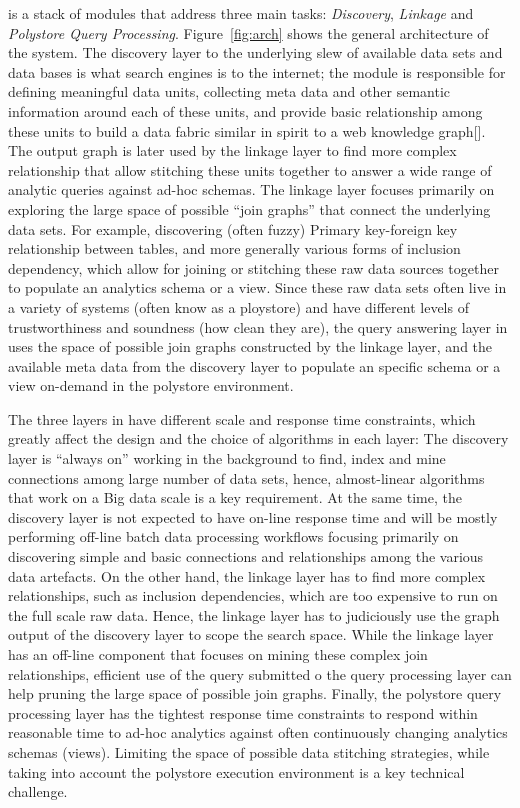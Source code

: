 \dcv is a stack of modules that address three main tasks: {\em Discovery}, 
{\em Linkage} and  {\em Polystore Query Processing}. Figure~\ref{fig:arch} shows the general architecture of the \dcv system. The discovery layer to the underlying slew of available data sets and data bases is what search engines is to the internet; the module is responsible for defining meaningful data units, collecting meta data and other semantic information around each of these units, and provide basic relationship among these units to build a data fabric similar in spirit to a web knowledge graph[]. The output graph is later used by the linkage layer to find more complex relationship that allow stitching these units together to answer a wide range of analytic queries against ad-hoc schemas. The linkage layer focuses primarily on exploring the large space of possible ``join graphs'' that connect the underlying data sets. For example, discovering (often fuzzy) Primary key-foreign key relationship between tables, and more generally various forms of inclusion dependency, which allow for joining or stitching these raw data sources together to populate an analytics schema or a view. Since these raw data sets often live in a variety of systems (often know as a ploystore) and have different levels of trustworthiness and soundness (how clean they are), the query answering layer in \dcv uses the space of possible join graphs constructed by the linkage layer, and the available meta data from the discovery layer to populate an specific schema or a view on-demand in the polystore environment.   


The three layers in \dcv have different scale and response time constraints, which greatly affect the design and the choice of algorithms in each layer: The discovery layer is ``always on'' working in the background to find, index and mine connections among large number of data sets, hence, almost-linear algorithms that work on a Big data scale is a key requirement. At the same time, the discovery layer is not expected to have on-line response time and will be mostly performing off-line batch data processing workflows focusing primarily on discovering simple and basic connections and relationships among the various data artefacts. On the other hand, the linkage layer has to find more complex relationships, such as inclusion dependencies, which are too expensive to run on the full scale raw data. Hence, the linkage layer has to judiciously use the graph output of the discovery layer to scope the search space. While the linkage layer has an off-line component that focuses on mining these complex join relationships, efficient use of the query submitted o the query processing layer can help pruning the large space of possible join graphs. Finally, the polystore query processing layer has the tightest response time constraints to respond within reasonable time to ad-hoc analytics against often continuously changing analytics schemas (views). Limiting the space of possible data stitching strategies, while taking into account the polystore execution environment is a key technical challenge. 


